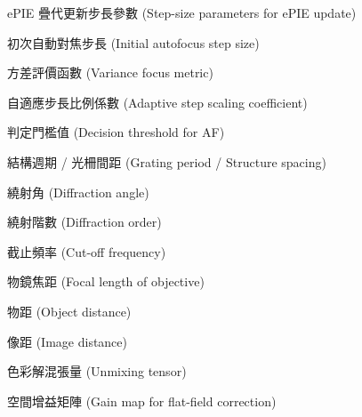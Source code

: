 \begin{denotation}[3cm]
\item[$\alpha, \beta$]{
  ePIE 疊代更新步長參數 (Step-size parameters for ePIE update)
}

\item[$step_1$]{
  初次自動對焦步長 (Initial autofocus step size)
}

\item[$F_{var}$]{
  方差評價函數 (Variance focus metric)
}

\item[$k$]{
  自適應步長比例係數 (Adaptive step scaling coefficient)
}

\item[$\Delta F_0$]{
  判定門檻值 (Decision threshold for AF)
}

\item[$d$]{
  結構週期 / 光柵間距 (Grating period / Structure spacing)
}

\item[$\theta$]{
  繞射角 (Diffraction angle)
}

\item[$m$]{
  繞射階數 (Diffraction order)
}

\item[$f_c$]{
  截止頻率 (Cut-off frequency)
}

\item[$f$]{
  物鏡焦距 (Focal length of objective)
}

\item[$u$]{
  物距 (Object distance)
}

\item[$v$]{
  像距 (Image distance)
}

\item[$U$]{
  色彩解混張量 (Unmixing tensor)
}

\item[$G$]{
  空間增益矩陣 (Gain map for flat-field correction)
}

\end{denotation}
